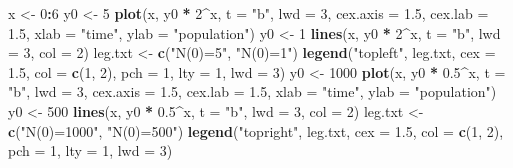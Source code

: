 \documentclass[
]{book}
\newenvironment{Shaded}{\begin{snugshade}}{\end{snugshade}}
\newcommand{\DataTypeTok}[1]{\textcolor[rgb]{0.13,0.29,0.53}{#1}}
\newcommand{\DecValTok}[1]{\textcolor[rgb]{0.00,0.00,0.81}{#1}}
\newcommand{\FloatTok}[1]{\textcolor[rgb]{0.00,0.00,0.81}{#1}}
\newcommand{\KeywordTok}[1]{\textcolor[rgb]{0.13,0.29,0.53}{\textbf{#1}}}
\newcommand{\NormalTok}[1]{#1}
\newcommand{\OperatorTok}[1]{\textcolor[rgb]{0.81,0.36,0.00}{\textbf{#1}}}
\newcommand{\StringTok}[1]{\textcolor[rgb]{0.31,0.60,0.02}{#1}}
\theoremstyle{definition}
\theoremstyle{definition}
\theoremstyle{definition}
\theoremstyle{remark}
\begin{document}
\begin{Shaded}
\begin{Highlighting}[]
\NormalTok{x \textless{}{-}}\StringTok{ }\DecValTok{0}\OperatorTok{:}\DecValTok{6}
\NormalTok{y0 \textless{}{-}}\StringTok{ }\DecValTok{5}
\KeywordTok{plot}\NormalTok{(x, y0 }\OperatorTok{*}\StringTok{ }\DecValTok{2}\OperatorTok{\^{}}\NormalTok{x, }\DataTypeTok{t =} \StringTok{"b"}\NormalTok{, }\DataTypeTok{lwd =} \DecValTok{3}\NormalTok{, }\DataTypeTok{cex.axis =} \FloatTok{1.5}\NormalTok{, }
    \DataTypeTok{cex.lab =} \FloatTok{1.5}\NormalTok{, }\DataTypeTok{xlab =} \StringTok{"time"}\NormalTok{, }\DataTypeTok{ylab =} \StringTok{"population"}\NormalTok{)}
\NormalTok{y0 \textless{}{-}}\StringTok{ }\DecValTok{1}
\KeywordTok{lines}\NormalTok{(x, y0 }\OperatorTok{*}\StringTok{ }\DecValTok{2}\OperatorTok{\^{}}\NormalTok{x, }\DataTypeTok{t =} \StringTok{"b"}\NormalTok{, }\DataTypeTok{lwd =} \DecValTok{3}\NormalTok{, }\DataTypeTok{col =} \DecValTok{2}\NormalTok{)}
\NormalTok{leg.txt \textless{}{-}}\StringTok{ }\KeywordTok{c}\NormalTok{(}\StringTok{"N(0)=5"}\NormalTok{, }\StringTok{"N(0)=1"}\NormalTok{)}
\KeywordTok{legend}\NormalTok{(}\StringTok{"topleft"}\NormalTok{, leg.txt, }\DataTypeTok{cex =} \FloatTok{1.5}\NormalTok{, }\DataTypeTok{col =} \KeywordTok{c}\NormalTok{(}\DecValTok{1}\NormalTok{, }\DecValTok{2}\NormalTok{), }
    \DataTypeTok{pch =} \DecValTok{1}\NormalTok{, }\DataTypeTok{lty =} \DecValTok{1}\NormalTok{, }\DataTypeTok{lwd =} \DecValTok{3}\NormalTok{)}
\NormalTok{y0 \textless{}{-}}\StringTok{ }\DecValTok{1000}
\KeywordTok{plot}\NormalTok{(x, y0 }\OperatorTok{*}\StringTok{ }\FloatTok{0.5}\OperatorTok{\^{}}\NormalTok{x, }\DataTypeTok{t =} \StringTok{"b"}\NormalTok{, }\DataTypeTok{lwd =} \DecValTok{3}\NormalTok{, }\DataTypeTok{cex.axis =} \FloatTok{1.5}\NormalTok{, }
    \DataTypeTok{cex.lab =} \FloatTok{1.5}\NormalTok{, }\DataTypeTok{xlab =} \StringTok{"time"}\NormalTok{, }\DataTypeTok{ylab =} \StringTok{"population"}\NormalTok{)}
\NormalTok{y0 \textless{}{-}}\StringTok{ }\DecValTok{500}
\KeywordTok{lines}\NormalTok{(x, y0 }\OperatorTok{*}\StringTok{ }\FloatTok{0.5}\OperatorTok{\^{}}\NormalTok{x, }\DataTypeTok{t =} \StringTok{"b"}\NormalTok{, }\DataTypeTok{lwd =} \DecValTok{3}\NormalTok{, }\DataTypeTok{col =} \DecValTok{2}\NormalTok{)}
\NormalTok{leg.txt \textless{}{-}}\StringTok{ }\KeywordTok{c}\NormalTok{(}\StringTok{"N(0)=1000"}\NormalTok{, }\StringTok{"N(0)=500"}\NormalTok{)}
\KeywordTok{legend}\NormalTok{(}\StringTok{"topright"}\NormalTok{, leg.txt, }\DataTypeTok{cex =} \FloatTok{1.5}\NormalTok{, }\DataTypeTok{col =} \KeywordTok{c}\NormalTok{(}\DecValTok{1}\NormalTok{, }\DecValTok{2}\NormalTok{), }
    \DataTypeTok{pch =} \DecValTok{1}\NormalTok{, }\DataTypeTok{lty =} \DecValTok{1}\NormalTok{, }\DataTypeTok{lwd =} \DecValTok{3}\NormalTok{)}
\end{Highlighting}
\end{Shaded}
\end{document}
